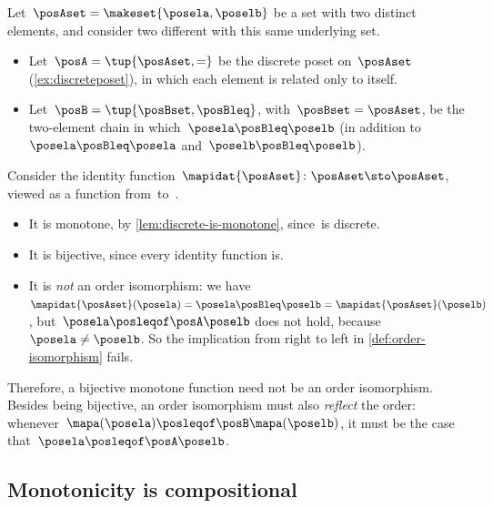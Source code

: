 \begin{example}
    \label{exa:bijective-monotone-not-iso}
    Let~$\posAset = \makeset{\posela, \poselb}$ be a set with two distinct elements, and consider two different  with this same underlying set.
    \begin{itemize}
        \item Let~$\posA = \tup{\posAset, {{=}}}$ be the discrete poset on~$\posAset$ (\cref{ex:discreteposet}), in which each element is related only to itself.
        \item Let~$\posB = \tup{\posBset, \posBleq}$, with~$\posBset = \posAset$, be the two-element chain in which~$\posela \posBleq \poselb$ (in addition to~$\posela \posBleq \posela$ and~$\poselb \posBleq \poselb$).
    \end{itemize}
    Consider the identity function~$\mapidat{\posAset}\colon \posAset \sto \posAset$, viewed as a function from~\posA to~\posB.
    \begin{itemize}
        \item It is monotone, by \cref{lem:discrete-is-monotone}, since~\posA is discrete.
        \item It is bijective, since every identity function is.
        \item It is \emph{not} an order isomorphism: we have~$\mapidat{\posAset}(\posela) = \posela \posBleq \poselb = \mapidat{\posAset}(\poselb)$, but~$\posela \posleqof\posA \poselb$ does not hold, because~$\posela \neq \poselb$.
        So the implication from right to left in \cref{def:order-isomorphism} fails.
    \end{itemize}
\end{example}
Therefore, a bijective monotone function need not be an order isomorphism.
Besides being bijective, an order isomorphism must also \emph{reflect} the order: whenever~$\mapa(\posela) \posleqof\posB \mapa(\poselb)$, it must be the case that~$\posela \posleqof\posA \poselb$.

\subsection{Monotonicity is compositional}

